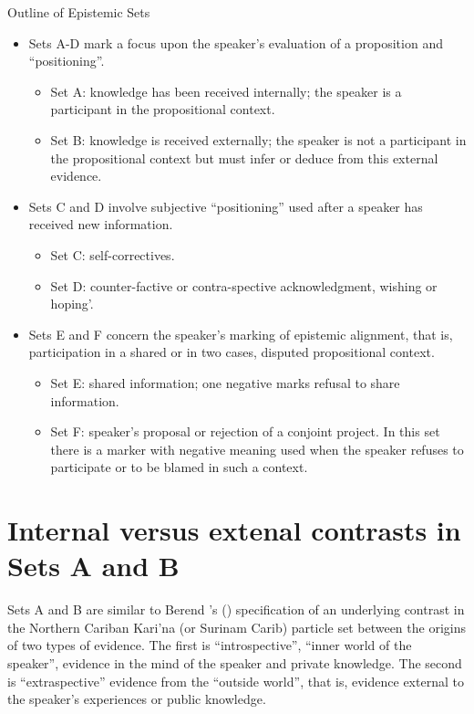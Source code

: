 \documentclass[output=paper]{langsci/langscibook}
\begin{document}
Outline of Epistemic Sets
\begin{itemize}
	\item Sets A-D mark a focus upon the speaker’s evaluation of a proposition and ``positioning''.
	\begin{itemize}
		\item Set A: knowledge has been received internally; the speaker is a participant in the propositional context. 
		\item Set B: knowledge is received externally; the speaker is not a participant in the propositional context but must infer or deduce from this external evidence.     
	\end{itemize}    
	\item Sets C and D involve subjective ``positioning'' used after a speaker has received new information.
	\begin{itemize}
		\item Set C: self-correctives. 
		\item Set D: counter-factive or contra-spective acknowledgment,  wishing or hoping’.
	\end{itemize}
	\item Sets E and F concern the speaker’s marking of epistemic alignment, that is, participation in a shared or in two cases, disputed propositional context. 
	\begin{itemize}
		\item Set E: shared information; one negative marks refusal to share information.
		\item Set F: speaker’s proposal or rejection of a conjoint project. In this set there is a marker with negative meaning used when the speaker refuses to participate or to be blamed in such a context.
	\end{itemize}
\end{itemize}

\section{Internal versus extenal contrasts in Sets A and B}\label{s:eb2}

Sets A and B are similar to Berend \citeauthor{Hoff1986}’s (\citeyear{Hoff1986}) specification of an underlying contrast in the Northern Cariban Kari’na (or Surinam Carib) particle set between the origins of two types of evidence.  The first is “introspective”, “inner world of the speaker”, evidence in the mind of the speaker and private knowledge.  The second is ``extraspective'' evidence from the “outside world”, that is, evidence external to the speaker’s experiences or public knowledge.
\end{document}

